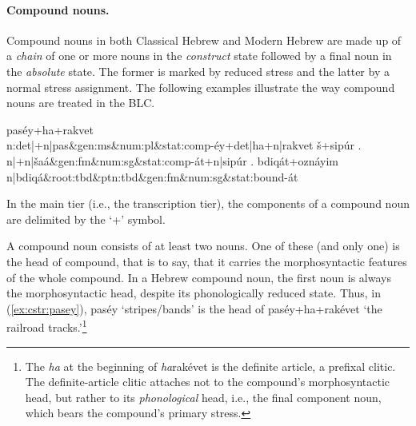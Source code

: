 \paragraph{Compound nouns.}
Compound nouns in both Classical Hebrew and Modern Hebrew are made up of a \emph{chain} of 
one or more nouns in the \emph{construct} state followed by a final noun
in the \emph{absolute} state. The former is marked by reduced stress 
and the latter by a normal stress assignment. The following examples 
illustrate the way compound nouns are treated in the BLC.
\begin{exe}
\ex \label{ex:cstr:pasey}
	\textsf{pas\'{e}y+ha+rakvet} \\
	\textsf{n:det|+n|pas\&gen:ms\&num:pl\&stat:comp-\'{e}y+det|ha+n|rakvet}
\ex \label{ex:cstr:shaat} 
	\textsf{\v{s}+sip\'{u}r .} \\
	\textsf{n|+n|\v{s}a\'a\&gen:fm\&num:sg\&stat:comp-\'at+n|sip\'ur .}
\ex \label{ex:cstr:bdiqat} 
	\textsf{bdiq\'{a}t+ozn\'{a}yim} \\ 
	\textsf{n|bdiq\'{a}\&root:tbd\&ptn:tbd\&gen:fm\&num:sg\&stat:bound-\'{a}t}
\end{exe}
In the main tier (i.e., the transcription tier), the components of a compound noun are
delimited by the `+' symbol. 

A compound noun consists of at least two nouns. One of these 
(and only one) is the head of compound, that is to say, that it carries 
the morphosyntactic features of the whole compound. In a Hebrew compound 
noun, the first noun
is always the morphosyntactic head, despite its phonologically 
reduced state.
Thus, in (\ref{ex:cstr:pasey}), \textsf{pas\'{e}y} `stripes/bands' 
is the head of \textsf{pas\'{e}y+ha+rak\'{e}vet} `the railroad 
tracks.'\footnote{The \textit{ha} at the beginning of  
\textsf{\textit{ha}rak\'{e}vet} is the definite article, a prefixal 
clitic. The definite-article clitic attaches not to the compound's 
morphosyntactic head, but rather to its \emph{phonological} head, 
i.e., the final component noun, which bears the compound's primary stress.}

